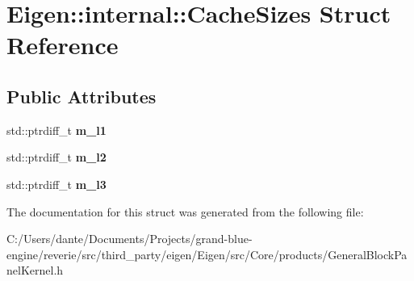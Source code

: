 \hypertarget{struct_eigen_1_1internal_1_1_cache_sizes}{}\section{Eigen\+::internal\+::Cache\+Sizes Struct Reference}
\label{struct_eigen_1_1internal_1_1_cache_sizes}
\subsection*{Public Attributes}
\begin{DoxyCompactItemize}
\item 
\mbox{\label{struct_eigen_1_1internal_1_1_cache_sizes_a2e40c5b1a5c224871d46bd8daf02bbf3}} 
std\+::ptrdiff\+\_\+t {\bfseries m\+\_\+l1}
\item 
\mbox{\label{struct_eigen_1_1internal_1_1_cache_sizes_aca8d9973df4c91cd3a9de81221a0b2d5}} 
std\+::ptrdiff\+\_\+t {\bfseries m\+\_\+l2}
\item 
\mbox{\label{struct_eigen_1_1internal_1_1_cache_sizes_af9ff1e9bc970c01499cf20974d0e8082}} 
std\+::ptrdiff\+\_\+t {\bfseries m\+\_\+l3}
\end{DoxyCompactItemize}


The documentation for this struct was generated from the following file\+:\begin{DoxyCompactItemize}
\item 
C\+:/\+Users/dante/\+Documents/\+Projects/grand-\/blue-\/engine/reverie/src/third\+\_\+party/eigen/\+Eigen/src/\+Core/products/General\+Block\+Panel\+Kernel.\+h\end{DoxyCompactItemize}
